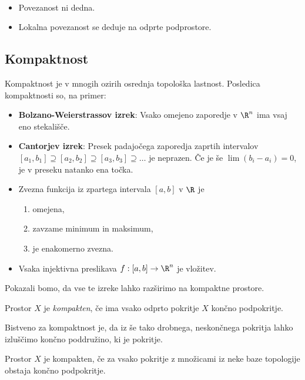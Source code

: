 \begin{opomba}
    \
    \begin{itemize}
        \item Povezanost ni dedna.
        \item Lokalna povezanost se deduje na odprte podprostore.
    \end{itemize}
\end{opomba}

\subsection{Kompaktnost}
Kompaktnost je v mnogih ozirih osrednja topološka lastnost. Posledica kompaktnosti so, na primer:
\begin{itemize}
    \item \textbf{Bolzano-Weierstrassov izrek}: Vsako omejeno zaporedje v $\R^n$ ima vsaj eno stekališče.
    \item \textbf{Cantorjev izrek}: Presek padajočega zaporedja zaprtih intervalov $[a_1, b_1] \supseteq [a_2, b_2] \supseteq [a_3, b_3] \supseteq \ldots$ je neprazen. Če je še $\lim(b_i - a_i) = 0$, je v preseku natanko ena točka.
    \item Zvezna funkcija iz zpartega intervala $[a,b]$ v $\R$ je 
    \begin{enumerate}
        \item omejena,
        \item zavzame minimum in maksimum,
        \item je enakomerno zvezna.
    \end{enumerate}
    \item Vsaka injektivna preslikava $f: [a,b] \to \R^n$ je vložitev.
\end{itemize}

Pokazali bomo, da vse te izreke lahko razširimo na kompaktne prostore.

\begin{definicija}
    Prostor $X$ je \emph{kompakten}, če ima vsako odprto pokritje $X$ končno podpokritje.
\end{definicija}

\begin{opomba}
    Bistveno za kompaktnost je, da iz še tako drobnega, neskončnega pokritja lahko izluščimo končno poddružino, ki je pokritje.
\end{opomba}

\begin{trditev}
    Prostor $X$ je kompakten, če za vsako pokritje z množicami iz neke baze topologije obstaja končno podpokritje.
\end{trditev}


